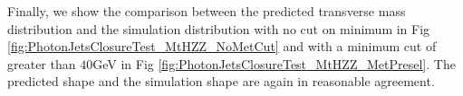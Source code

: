 Finally, we show the comparison between the predicted transverse mass distribution and the simulation
distribution with no cut on minimum \met in Fig \ref{fig:PhotonJetsClosureTest_MtHZZ_NoMetCut} and 
with a minimum \met cut of greater than $40$GeV in Fig \ref{fig:PhotonJetsClosureTest_MtHZZ_MetPresel}. 
The predicted shape and the simulation shape are again in reasonable agreement. 


